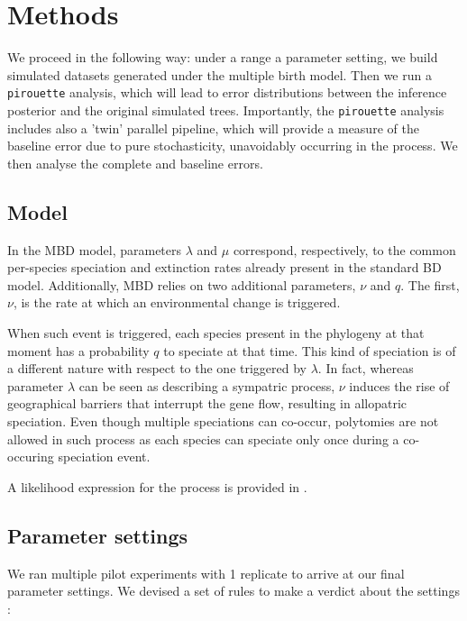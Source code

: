 \section{Methods}

We proceed in the following way:
under a range a parameter setting, 
we build simulated datasets generated under the multiple birth model. 
Then we run a \verb;pirouette; analysis, 
which will lead to error distributions
between the inference posterior and the original simulated trees. 
Importantly, the \verb;pirouette; analysis includes 
also a 'twin' parallel pipeline, 
which will provide a measure of the baseline error 
due to pure stochasticity, unavoidably occurring in the process.
We then analyse the complete and baseline errors.

\subsection{Model}

In the MBD model, parameters $\lambda$ and $\mu$ correspond, respectively, 
to the common per-species speciation and extinction rates 
already present in the standard BD model. 
Additionally, MBD relies on two additional parameters, $\nu$ and $q$. 
The first, $\nu$, is the rate at which an environmental change is triggered.

When such event is triggered, each species present in the phylogeny 
at that moment has a probability $q$ to speciate at that time.
This kind of speciation is of a different nature with respect to 
the one triggered by $\lambda$. 
In fact, whereas parameter $\lambda$ can be seen as 
describing a sympatric process, $\nu$ induces the rise of 
geographical barriers that interrupt the gene flow,
resulting in allopatric speciation. 
Even though multiple speciations can co-occur, 
polytomies are not allowed in such process as each species can speciate only 
once during a co-occuring speciation event.

A likelihood expression for the process is provided in \cite{mbd}.

\subsection{Parameter settings}

We ran multiple pilot experiments with 1 replicate to arrive at our final
parameter settings. We devised a set of rules to make a verdict about the
settings :

